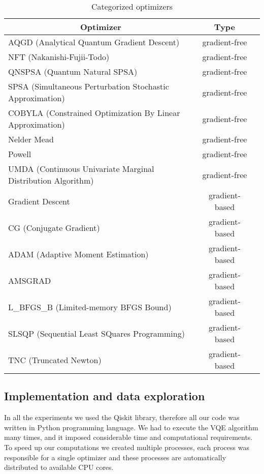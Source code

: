 \begin{table}[H]
    \centering
    \begin{tabular}{|l|c|c|} 
        \hline
        \multicolumn{1}{|c|}{\textbf{Optimizer}} & \textbf{Type}\\
        \hline
        AQGD (Analytical Quantum Gradient Descent) & gradient-free \\ 
        \hline
        NFT (Nakanishi-Fujii-Todo) & gradient-free \\ 
        \hline
        QNSPSA (Quantum Natural SPSA) & gradient-free \\ 
        \hline
        SPSA (Simultaneous Perturbation Stochastic Approximation) & gradient-free \\ 
        \hline
        COBYLA (Constrained Optimization By Linear Approximation) & gradient-free \\ 
        \hline
        Nelder Mead & gradient-free \\ 
        \hline
        Powell & gradient-free \\ 
        \hline
        UMDA (Continuous Univariate Marginal Distribution Algorithm) & gradient-free \\ 
        \hline
        Gradient Descent & gradient-based \\ 
        \hline
        CG (Conjugate Gradient) & gradient-based \\ 
        \hline
        ADAM (Adaptive Moment Estimation) & gradient-based \\ 
        \hline
        AMSGRAD & gradient-based \\ 
        \hline
        L\_BFGS\_B (Limited-memory BFGS Bound) & gradient-based \\ 
        \hline
        SLSQP (Sequential Least SQuares Programming) & gradient-based \\ 
        \hline
        TNC (Truncated Newton) & gradient-based \\ 
        \hline
    \end{tabular}
    \caption{Categorized optimizers}
    \label{tab:optimizers}
\end{table}

\subsection*{Implementation and data exploration}
In all the experiments we used the Qiskit library, therefore all our code was written in Python programming language. We had to execute the VQE algorithm many times, and it imposed considerable time and computational requirements. To speed up our computations we created multiple processes, each process was responsible for a single optimizer and these processes are automatically distributed to available CPU cores.


